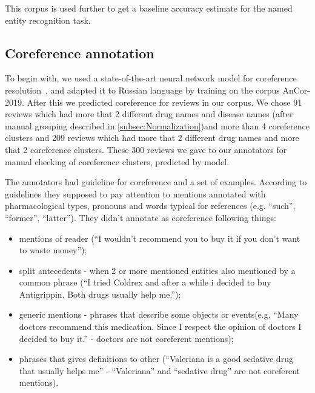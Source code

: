 \documentclass[a4paper,fleqn,longmktitle]{cas-dc}
\begin{document}
This corpus is used further to get a baseline accuracy estimate for the named entity recognition task.

\subsection{Coreference annotation}\label{subsec:Coreference_annotation}
To begin with, we used a state-of-the-art neural network model for coreference resolution~\cite{joshi2019bert}, and adapted it to Russian language by training on the corpus AnCor-2019.  After this we predicted coreference for reviews in our corpus. We chose 91 reviews which had more that 2 different drug names and disease names (after manual grouping described in \ref{subsec:Normalization})and more than 4 coreference clusters and 209 reviews which had more that 2 different drug names and more that 2 coreference clusters. These 300 reviews we gave to our annotators for manual checking of coreference clusters, predicted by model.

The annotators had guideline for coreference and a set of examples. According to guidelines they supposed to pay attention to mentions annotated with pharmacological types, pronouns and words typical for references (e.g. ``such'', ``former'', ``latter''). They didn't annotate as coreference following things:
\begin{itemize}
    \item mentions of reader (``I wouldn't recommend you to buy it if you don't want to waste money'');
    \item  split antecedents - when 2 or more mentioned entities also mentioned by a common phrase (``I tried Coldrex and after a while i decided to buy Antigrippin. Both drugs usually help me.'');
    \item generic mentions - phrases that describe some objects or events(e.g. ``Many doctors recommend this medication. Since I respect the opinion of doctors I decided to buy it.'' - doctors are not coreferent mentions);
    \item phrases that gives definitions to other (``Valeriana is a good sedative drug that usually helps me'' - ``Valeriana'' and ``sedative drug'' are not coreferent mentions).
\end{itemize}
\end{document}
